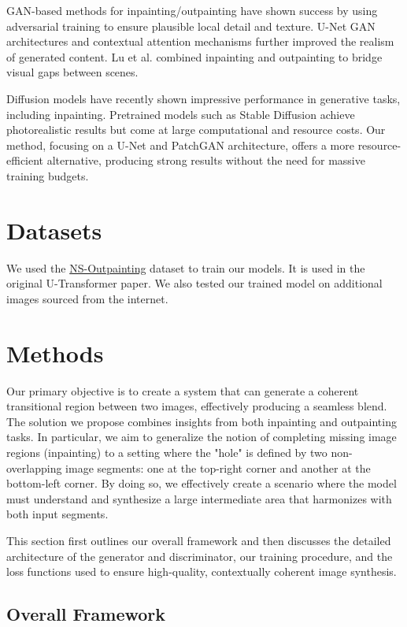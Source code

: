\documentclass[sigconf]{acmart}
\begin{document}
GAN-based methods for inpainting/outpainting \cite{Isola2017,Yu2018,Yang2019} have shown success by using adversarial training to ensure plausible local detail and texture. U-Net GAN architectures \cite{Ronneberger2015} and contextual attention mechanisms further improved the realism of generated content. Lu et al. \cite{Lu2021} combined inpainting and outpainting to bridge visual gaps between scenes.

Diffusion models \cite{Lugmayr2022,Rombach2022} have recently shown impressive performance in generative tasks, including inpainting. Pretrained models such as Stable Diffusion achieve photorealistic results but come at large computational and resource costs. Our method, focusing on a U-Net and PatchGAN architecture, offers a more resource-efficient alternative, producing strong results without the need for massive training budgets.

\section*{Datasets}
We used the \textcolor{red}{\href{https://github.com/z-x-yang/NS-Outpainting}{NS-Outpainting}} dataset to train our models. It is used in the original U-Transformer paper. We also tested our trained model on additional images sourced from the internet.

\section*{Methods}

Our primary objective is to create a system that can generate a coherent transitional region between two images, effectively producing a seamless blend. The solution we propose combines insights from both inpainting and outpainting tasks. In particular, we aim to generalize the notion of completing missing image regions (inpainting) to a setting where the "hole" is defined by two non-overlapping image segments: one at the top-right corner and another at the bottom-left corner. By doing so, we effectively create a scenario where the model must understand and synthesize a large intermediate area that harmonizes with both input segments.

This section first outlines our overall framework and then discusses the detailed architecture of the generator and discriminator, our training procedure, and the loss functions used to ensure high-quality, contextually coherent image synthesis.

\subsection*{Overall Framework}
\end{document}

